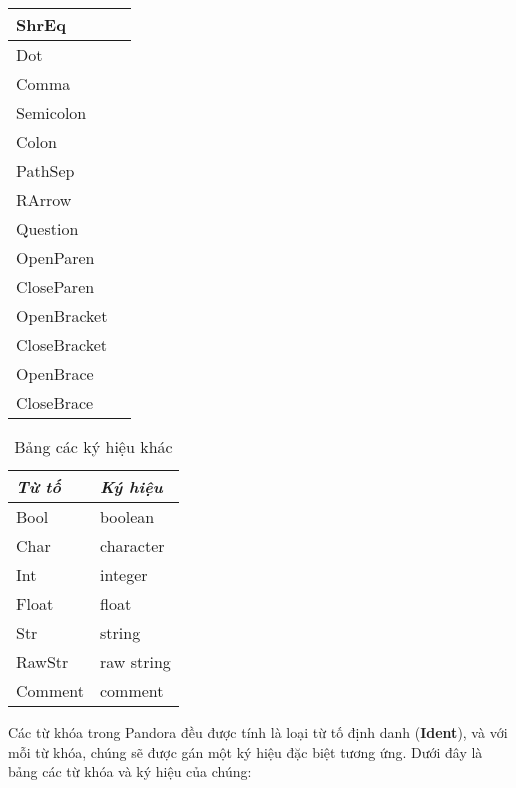 \begin{longtable}{|p{4cm}|p{4cm}|}
\hline
ShrEq & \kw{>}\kw{>=} \\
\hline
Dot & \kw{.} \\
\hline
Comma & \kw{,} \\
\hline
Semicolon & \kw{;} \\
\hline
Colon & \kw{:} \\
\hline
PathSep & \kw{::} \\
\hline
RArrow & \kw{->} \\
\hline
Question & \kw{?} \\
\hline
OpenParen & \kw{(} \\
\hline
CloseParen & \kw{)} \\
\hline
OpenBracket & \kw{[} \\
\hline
CloseBracket & \kw{]} \\
\hline
OpenBrace & \kw{\{} \\
\hline
CloseBrace & \kw{\}} \\
\hline
\end{longtable}

\begin{longtable}{|p{4cm}|p{4cm}|}
    \caption{Bảng các ký hiệu khác} \\
\hline
\textbf{\textit{Từ tố}} & \textbf{\textit{Ký hiệu}} \\
\hline
Bool & boolean \\
\hline
Char & character \\
\hline
Int & integer \\
\hline
Float & float \\
\hline
Str & string \\
\hline
RawStr & raw string \\
\hline
Comment & comment \\
\hline
\end{longtable}

Các từ khóa trong Pandora đều được tính là loại từ tố định danh (\textbf{Ident}), và với mỗi từ khóa, chúng sẽ được gán một ký hiệu đặc biệt tương ứng. Dưới đây là bảng các từ khóa và ký hiệu của chúng:

